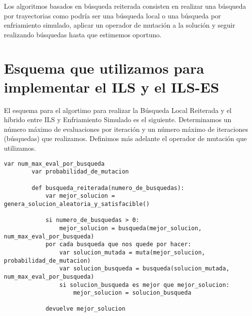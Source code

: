 Los algoritmos basados en búsqueda reiterada consisten en realizar
una búsqueda por trayectorias como podría ser una búsqueda local
o una búsqueda por enfriamiento simulado, aplicar un operador de mutación
a la solución y seguir realizando búsquedas hasta que estimemos oportuno.

\begin{minipage}{\textwidth}
	\section{Esquema que utilizamos para implementar el ILS y el ILS-ES}

	El esquema para el algortimo para realizar la Búsqueda Local Reiterada
	y el híbrido entre ILS y Enfriamiento Simulado es el siguiente.
	Determinamos un número máximo de evaluaciones por iteración y un número
	máximo de iteraciones (búsquedas) que realizamos. Definimos más adelante
	el operador de mutación que utilizamos.

	\begin{lstlisting}[mathescape=true,caption={Esquema general de un algoritmo basado en Búsqueda Reiterada.
						Según apliquemos Búsqueda Local o Enfriamiento Simulado definimos la función de búsqueda
						tal y como describimos en sus respectivos capítulos.},captionpos=b]
		var num_max_eval_por_busqueda
		var probabilidad_de_mutacion

		def busqueda_reiterada(numero_de_busquedas):
			var mejor_solucion = genera_solucion_aleatoria_y_satisfacible()

			si numero_de_busquedas > 0:
				mejor_solucion = busqueda(mejor_solucion, num_max_eval_por_busqueda)
			por cada busqueda que nos quede por hacer:
				var solucion_mutada = muta(mejor_solucion, probabilidad_de_mutacion)
				var solucion_busqueda = busqueda(solucion_mutada, num_max_eval_por_busqueda)
				si solucion_busqueda es mejor que mejor_solucion:
					mejor_solucion = solucion_busqueda
			
			devuelve mejor_solucion
	\end{lstlisting}
\end{minipage}

